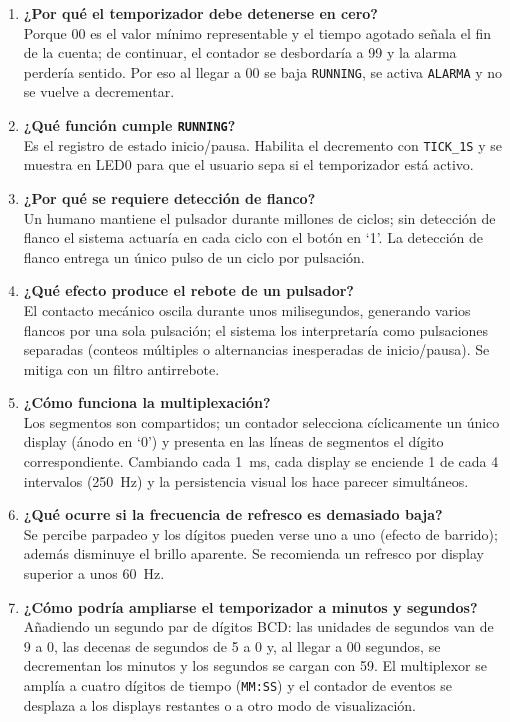 \documentclass[letterpaper,12pt]{article}
\begin{document}
\begin{enumerate}
    \item \textbf{¿Por qué el temporizador debe detenerse en cero?}\\
    Porque 00 es el valor mínimo representable y el tiempo agotado señala el fin de la cuenta; de continuar, el contador se desbordaría a 99 y la alarma perdería sentido. Por eso al llegar a 00 se baja \texttt{RUNNING}, se activa \texttt{ALARMA} y no se vuelve a decrementar.

    \item \textbf{¿Qué función cumple \texttt{RUNNING}?}\\
    Es el registro de estado inicio/pausa. Habilita el decremento con \texttt{TICK\_1S} y se muestra en LED0 para que el usuario sepa si el temporizador está activo.

    \item \textbf{¿Por qué se requiere detección de flanco?}\\
    Un humano mantiene el pulsador durante millones de ciclos; sin detección de flanco el sistema actuaría en cada ciclo con el botón en `1'. La detección de flanco entrega un único pulso de un ciclo por pulsación.

    \item \textbf{¿Qué efecto produce el rebote de un pulsador?}\\
    El contacto mecánico oscila durante unos milisegundos, generando varios flancos por una sola pulsación; el sistema los interpretaría como pulsaciones separadas (conteos múltiples o alternancias inesperadas de inicio/pausa). Se mitiga con un filtro antirrebote.

    \item \textbf{¿Cómo funciona la multiplexación?}\\
    Los segmentos son compartidos; un contador selecciona cíclicamente un único display (ánodo en `0') y presenta en las líneas de segmentos el dígito correspondiente. Cambiando cada 1~ms, cada display se enciende 1 de cada 4 intervalos (250~Hz) y la persistencia visual los hace parecer simultáneos.

    \item \textbf{¿Qué ocurre si la frecuencia de refresco es demasiado baja?}\\
    Se percibe parpadeo y los dígitos pueden verse uno a uno (efecto de barrido); además disminuye el brillo aparente. Se recomienda un refresco por display superior a unos 60~Hz.

    \item \textbf{¿Cómo podría ampliarse el temporizador a minutos y segundos?}\\
    Añadiendo un segundo par de dígitos BCD: las unidades de segundos van de 9 a 0, las decenas de segundos de 5 a 0 y, al llegar a 00 segundos, se decrementan los minutos y los segundos se cargan con 59. El multiplexor se amplía a cuatro dígitos de tiempo (\texttt{MM:SS}) y el contador de eventos se desplaza a los displays restantes o a otro modo de visualización.
\end{enumerate}
\end{document}
